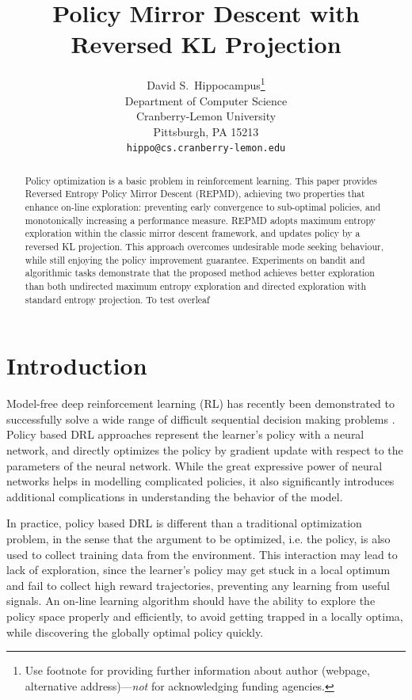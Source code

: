 \documentclass{article}
\title{Policy Mirror Descent with Reversed KL Projection}
\author{
  David S.~Hippocampus\thanks{Use footnote for providing further
    information about author (webpage, alternative
    address)---\emph{not} for acknowledging funding agencies.} \\
  Department of Computer Science\\
  Cranberry-Lemon University\\
  Pittsburgh, PA 15213 \\
  \texttt{hippo@cs.cranberry-lemon.edu} \\
}
\begin{document}

\maketitle

\begin{abstract}
Policy optimization is a basic problem in reinforcement learning. This paper provides Reversed Entropy Policy Mirror Descent (REPMD), achieving two properties that enhance on-line exploration: preventing early convergence to  sub-optimal policies, and monotonically increasing a performance measure. REPMD adopts maximum entropy exploration within the classic mirror descent framework, and updates policy by a reversed KL projection. This approach overcomes undesirable mode seeking behaviour, while still enjoying the policy improvement guarantee. Experiments on bandit and algorithmic tasks demonstrate that the proposed method achieves better exploration than both undirected maximum entropy exploration and directed exploration with standard entropy projection.%
To test overleaf
\end{abstract}

\section{Introduction}
Model-free deep reinforcement learning (RL) has recently been demonstrated to successfully solve a wide range of difficult sequential decision making problems \cite{schulman2015trust,mnih2015human,silver2016mastering}. Policy based DRL approaches represent the learner's policy with a neural network, and directly optimizes the policy by gradient update with respect to the parameters of the neural network. While the great expressive power of neural networks helps in modelling complicated policies, it also significantly introduces additional complications in understanding the behavior of the model. 

In practice, policy based DRL is different than a traditional optimization problem, in the sense that the argument to be optimized, i.e. the policy, is also used to collect training data from the environment. This interaction may lead to lack of exploration, since the learner's policy may get stuck in a local optimum and fail to collect high reward trajectories, preventing any learning from useful signals.  An on-line learning algorithm should have the ability to explore the policy space properly and efficiently, to avoid getting trapped in a locally optima, while discovering the globally optimal policy quickly.
\end{document}
